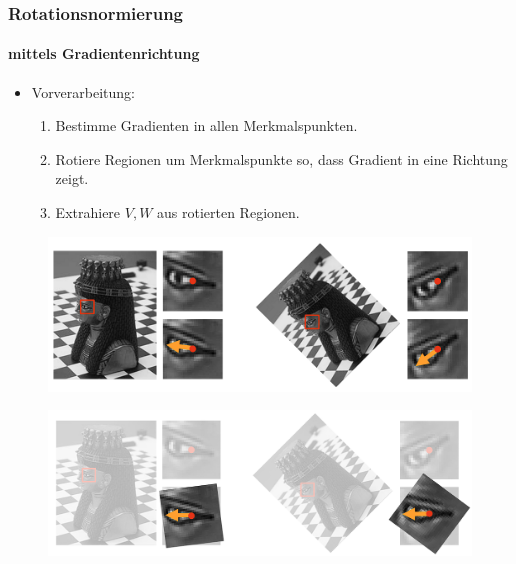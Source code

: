 \documentclass[12pt, a4paper, oneside]{article}
\begin{document}
\subsubsection{Rotationsnormierung}
\paragraph*{mittels Gradientenrichtung}

\begin{itemize}
  \item Vorverarbeitung:
    \begin{enumerate}
      \item Bestimme Gradienten in allen Merkmalspunkten.
      \item Rotiere Regionen um Merkmalspunkte so, dass Gradient in eine Richtung zeigt.
      \item Extrahiere $V,W$ aus rotierten Regionen.
    \end{enumerate}
\end{itemize}
\begin{figure}[htbp]
    \centering
    \includegraphics[scale=0.6]{../img/1-16.png}
    \label{img/1-16}
\end{figure}
\begin{figure}[htbp]
    \centering
    \includegraphics[scale=0.6]{../img/1-17.png}
    \label{img/1-17}
\end{figure}
\end{document}
